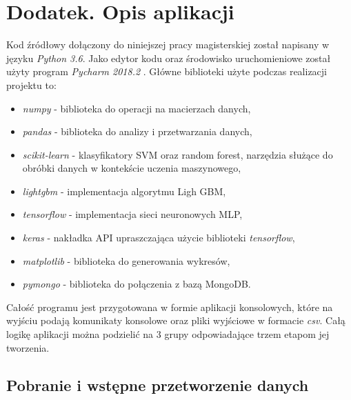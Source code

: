 \documentclass[a4paper, twoside, 11pt, openright]{article}
\begin{document}
\newpage


\listoffigures

\newpage 


\listoftables

\newpage


\section*{Dodatek. Opis aplikacji}


Kod źródłowy dołączony do niniejszej pracy magisterskiej został napisany w języku \textit{Python 3.6}. Jako edytor kodu oraz środowisko uruchomieniowe został użyty program \textit{Pycharm 2018.2} \cite{pycharm}. Główne biblioteki użyte podczas realizacji projektu to:
\begin{itemize}
    \item \textit{numpy} - biblioteka do operacji na macierzach danych,
    \item \textit{pandas} - biblioteka do analizy i przetwarzania danych,
    \item \textit{scikit-learn} - klasyfikatory SVM oraz random forest, narzędzia służące do obróbki danych w kontekście uczenia maszynowego,
    \item \textit{lightgbm} - implementacja algorytmu Ligh GBM,
    \item \textit{tensorflow} - implementacja sieci neuronowych MLP,
    \item \textit{keras} - nakładka API upraszczająca użycie biblioteki \textit{tensorflow},
    \item \textit{matplotlib} - biblioteka do generowania wykresów,
    \item \textit{pymongo} - biblioteka do połączenia z bazą MongoDB.
\end{itemize}

Całość programu jest przygotowana w formie aplikacji konsolowych, które na wyjściu podają komunikaty konsolowe oraz pliki wyjściowe w formacie \textit{csv}. Całą logikę aplikacji można podzielić na 3 grupy odpowiadające trzem etapom jej tworzenia.

\bigskip

\subsection*{Pobranie i wstępne przetworzenie danych}
\end{document}
